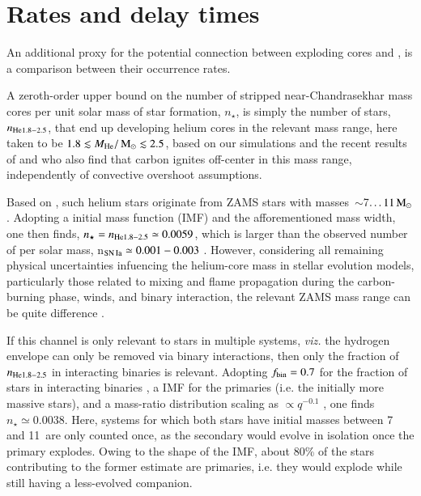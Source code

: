\documentclass[twocolumn]{aa}
\begin{document}
\section{Rates and delay times}\label{sec:4}
An additional  proxy for the potential connection between exploding \one cores and \ia, is a comparison between their  occurrence rates. 

A zeroth-order upper bound on the number of stripped near-Chandrasekhar mass \one cores per unit solar mass of star formation, $n_\star$, is 
simply the number of stars, $n_{\rm{He}1.8-2.5}$, that end up developing  helium cores in the relevant mass range, here taken to be $1.8\lesssim M_{\rm{He}}/\mathrm{\,M_\odot} \lesssim 2.5$, based on our simulations and the recent results of \cite{Woosley:2019sdf} and \cite{Farmer:2015afs} who also find that carbon ignites off-center in this mass range, independently of convective overshoot assumptions.

Based on 
\cite{Farmer:2015afs},  such helium stars originate from ZAMS stars with masses~$\sim$7$\ldots 11\mathrm{\,M_\odot}$. Adopting a \cite{Chabrier:2004vw} initial mass function (IMF) and the afforementioned mass width, one then finds,  $n_\star=n_{\rm{He}1.8-2.5}\simeq 0.0059$, which is larger than the observed number of \ias per solar mass, n$_{\rm SN\,Ia}\simeq 0.001-0.003$ \citep[e.g][]{claeys2014a,Maoz:2013hna}. 
However, considering all remaining physical uncertainties infuencing the helium-core 
mass in stellar evolution models, particularly those related to mixing and flame 
propagation during the carbon-burning phase, winds, and binary interaction, the 
relevant ZAMS mass range can be quite difference \citep[for instance, see][and references therein]{poelarends2007,Poelarends:2007ip,chen2014b,Meng:2014qta,doherty2015}. 

If this channel is only relevant to stars in multiple systems, {\it viz.} the hydrogen envelope can only be removed via binary 
interactions, then only the fraction of $n_{\rm{He}1.8-2.5}$ in interacting binaries is relevant. 
Adopting $f_{\rm bin}=0.7$ for the fraction of stars in interacting binaries \citep{Sana:2012px}, a \cite{Chabrier:2004vw} IMF for the primaries (i.e. the 
initially more massive stars), and a mass-ratio distribution scaling as $\propto q^{-0.1}$ \citep{Sana:2012px}, one finds $n_\star \simeq 0.0038$. Here, systems for which both stars have initial masses between 7 and 11\msun\ are only counted once, as the secondary would evolve in isolation once the primary explodes. Owing to the shape of the IMF, about 80\% of the stars contributing to the former estimate are primaries, i.e. they would explode while still having a less-evolved companion. 
\end{document}
